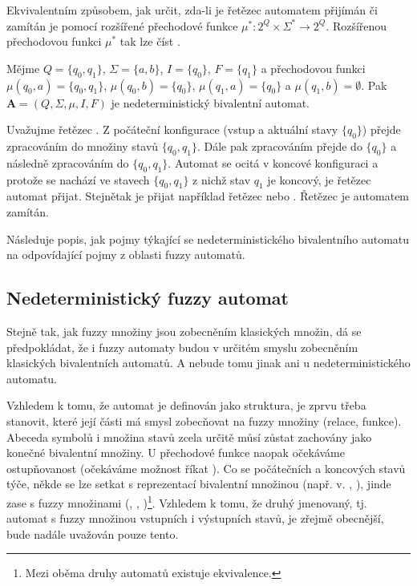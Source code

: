 \documentclass[a4paper,10pt]{article}
\begin{document}
Ekvivalentním způsobem, jak určit, zda-li je řetězec automatem přijímán či zamítán je pomocí rozšířené přechodové funkce $\mu^*: 2^Q \times \Sigma^* \rightarrow 2^Q$. Rozšířenou přechodovou funkci $\mu^*$ tak lze číst .

\begin{example}
 Mějme $Q = \{ q_0, q_1 \}$, $\Sigma = \{ a, b \}$, $I = \{ q_0 \}$, $F = \{ q_1 \}$ a přechodovou funkci $\mu(q_0, a) = \{ q_0, q_1 \}$, $\mu(q_0, b) = \{ q_0 \}$, $\mu(q_1, a) = \{ q_0 \}$ a $\mu(q_1, b) = \emptyset $. Pak $\mathbf{A} = (Q, \Sigma, \mu, I, F)$ je nedeterministický bivalentní automat.
 
 Uvažujme řetězec . Z počáteční konfigurace (vstup  a aktuální stavy $\{ q_0 \}$) přejde zpracováním  do množiny stavů $\{ q_0, q_1 \}$. Dále pak zpracováním  přejde do $\{ q_0 \}$ a následně zpracováním  do $\{ q_0, q_1 \}$. Automat se ocitá v koncové konfiguraci a protože se nachází ve stavech $\{ q_0, q_1 \}$ z nichž stav $q_1$ je koncový, je řetězec  automat přijat. Stejnětak je přijat například řetězec  nebo . Řetězec  je automatem zamítán.
\end{example}

Následuje popis, jak pojmy týkající se nedeterministického bivalentního automatu  na odpovídající pojmy z oblasti fuzzy automatů. 

\subsection{Nedeterministický fuzzy automat}
Stejně tak, jak fuzzy množiny jsou zobecněním klasických  množin, dá se předpokládat, že i fuzzy automaty budou v určitém smyslu zobecněním klasických bivalentních automatů. A nebude tomu jinak ani u nedeterministického automatu.

Vzhledem k tomu, že automat je definován jako struktura, je zprvu třeba stanovit, které její části má smysl zobecňovat na fuzzy množiny (relace, funkce). Abeceda symbolů i množina stavů zcela určitě můsí zůstat zachovány jako konečné bivalentní množiny. U přechodové funkce naopak očekáváme ostupňovanost (očekáváme možnost říkat ). Co se počátečních a koncových stavů týče, někde se lze setkat s reprezentací bivalentní množinou (např. v. \cite{AndAbdAsm-ApprPattMatcFuzzLog}, \cite{SnaKepAbrHas-AproxStriMatchFuzzAut}), jinde zase s fuzzy množinami (\cite{StaCir-ConsFuzzAutFuzzRegExp}, \cite{AstGariGonVillFar-ApprStrMatUsiDefFuzzAutLearExpr}, \cite{Bel-DetFuzzAut} \cite{GonGar-FuzzLangInfRanAccGuzzAutPumLemDetProc})\footnote{Mezi oběma druhy automatů existuje ekvivalence.}. Vzhledem k tomu, že druhý jmenovaný, tj. automat s fuzzy množinou vstupních i 
výstupních stavů, je zřejmě obecnější, bude nadále uvažován pouze tento.
\end{document}
